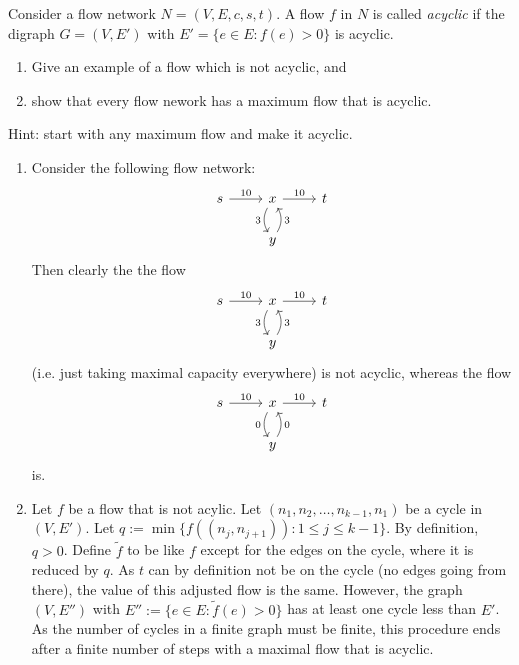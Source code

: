 \documentclass{article}
\begin{document}
\begin{exercise}
    Consider a flow network $N= (V,E,c,s,t)$. A flow $f$ in $N$ is called \textit{acyclic} if the digraph $G= (V,E')$ with $E'= \{e\in E: f(e)>0\}$ is acyclic. \begin{enumerate}
        \item Give an example of a flow which is not acyclic, and 
        \item show that every flow nework has a maximum flow that is acyclic.
    \end{enumerate}
    Hint: start with any maximum flow and make it acyclic.
\end{exercise}
\begin{solving}
    \begin{enumerate}
        \item Consider the following flow network:\begin{equation*}
            \begin{tikzcd}
                s \arrow[r, "10"]& x\arrow[d, bend right, "3"']\arrow[r, "10"] &t\\
                &y\arrow[u, bend right, "3"']
            \end{tikzcd}
        \end{equation*}
        Then clearly the the flow \begin{equation*}
            \begin{tikzcd}
                s \arrow[r, "10"]& x\arrow[d, bend right, "3"']\arrow[r, "10"] &t\\
                &y\arrow[u, bend right, "3"']
            \end{tikzcd}
        \end{equation*}
        (i.e. just taking maximal capacity everywhere) is not acyclic, whereas the flow 
        \begin{equation*}
            \begin{tikzcd}
                s \arrow[r, "10"]& x\arrow[d, bend right, "0"']\arrow[r, "10"] &t\\
                &y\arrow[u, bend right, "0"']
            \end{tikzcd}
        \end{equation*}
        is.
        \item Let $f$ be a flow that is not acylic. Let $(n_1,n_2,\dots,n_{k-1}, n_1)$ be a cycle in $(V,E')$. Let $q:= \min\{f((n_j,n_{j+1})): 1\leq j\leq k-1\}$. By definition, $q>0$. Define $\tilde f$ to be like $f$ except for the edges on the cycle, where it is reduced by $q$. As $t$ can by definition not be on the cycle (no edges going from there), the value of this adjusted flow is the same. However, the graph $(V,E'')$ with $E'':=\{e\in E: \tilde f(e)>0\}$ has at least one cycle less than $E'$. As the number of cycles in a finite graph must be finite, this procedure ends after a finite number of steps with a maximal flow that is acyclic. 
    \end{enumerate}
\end{solving}
\newpage
\end{document}
